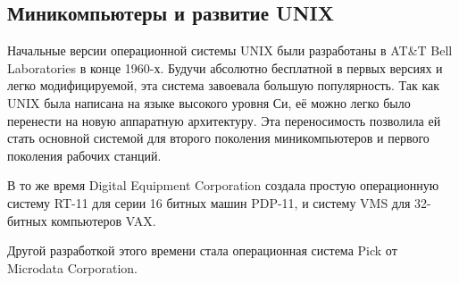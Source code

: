 \subsection{Миникомпьютеры и развитие UNIX}
Начальные версии операционной системы UNIX были разработаны в AT\&T Bell Laboratories в конце 1960-х. Будучи абсолютно бесплатной в первых версиях и легко модифицируемой, эта система завоевала большую популярность. Так как UNIX была написана на языке высокого уровня Си, её можно легко было перенести на новую аппаратную архитектуру. Эта переносимость позволила ей стать основной системой для второго поколения миникомпьютеров и первого поколения рабочих станций.

В то же время Digital Equipment Corporation создала простую операционную систему RT-11 для серии 16 битных машин PDP-11, и систему VMS для 32-битных компьютеров VAX.

Другой разработкой этого времени стала операционная система Pick от Microdata Corporation.